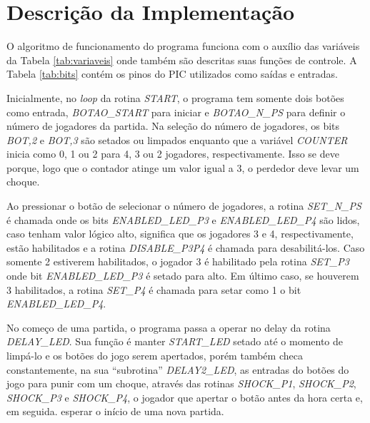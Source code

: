 \documentclass[a4paper,10pt]{article}
\title{}
\author{}
\begin{document}
\maketitle

\begin{abstract}

\end{abstract}

\section{Descrição da Implementação}

O algoritmo de funcionamento do programa funciona com o auxílio das variáveis da Tabela \ref{tab:variaveis} onde também são descritas suas funções de controle. A Tabela \ref{tab:bits} contém os pinos do PIC utilizados como saídas e entradas.

Inicialmente, no \textit{loop} da rotina \textit{START}, o programa tem somente dois botões como entrada, \textit{BOTAO\_START} para iniciar e \textit{BOTAO\_N\_PS} para definir o número de jogadores da partida. Na seleção do número de jogadores, os bits \textit{BOT,2} e \textit{BOT,3} são setados ou limpados enquanto que a variável \textit{COUNTER} inicia como 0, 1 ou 2 para 4, 3 ou 2 jogadores, respectivamente. Isso se deve porque, logo que o contador atinge um valor igual a 3, o perdedor deve levar um choque.

Ao pressionar o botão de selecionar o número de jogadores, a rotina \textit{SET\_N\_PS} é chamada onde os bits \textit{ENABLED\_LED\_P3} e \textit{ENABLED\_LED\_P4} são lidos, caso tenham valor lógico alto, significa que os jogadores 3 e 4, respectivamente, estão habilitados e a rotina \textit{DISABLE\_P3P4} é chamada para desabilitá-los. Caso somente 2 estiverem habilitados, o jogador 3 é habilitado pela rotina \textit{SET\_P3} onde bit \textit{ENABLED\_LED\_P3} é setado para alto. Em último caso, se houverem 3 habilitados, a rotina \textit{SET\_P4} é chamada para setar como 1 o bit \textit{ENABLED\_LED\_P4}.

No começo de uma partida, o programa passa a operar no delay da rotina \textit{DELAY\_LED}. Sua função é manter \textit{START\_LED} setado até o momento de limpá-lo e os botões do jogo serem apertados, porém também checa constantemente, na sua ``subrotina'' \textit{DELAY2\_LED}, as entradas do botões do jogo para punir com um choque, através das rotinas \textit{SHOCK\_P1}, \textit{SHOCK\_P2}, \textit{SHOCK\_P3} e \textit{SHOCK\_P4}, o jogador que apertar o botão antes da hora certa e, em seguida. esperar o início de uma nova partida.
\end{document}
